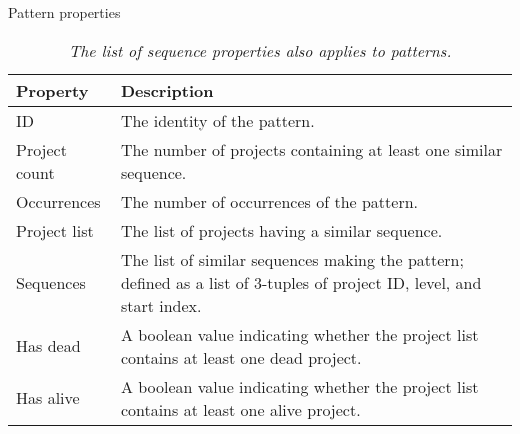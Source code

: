 \begin{table}[H]
\caption{Pattern properties}\label{table:pattern_props}
\caption*{\footnotesize\textit{The list of sequence properties also applies to
patterns.}}
\centering
\begin{tabular}{lp{10cm}}
\hline
	\textbf{Property} & \textbf{Description} \\
	\hline
	ID & The identity of the pattern. \\
	Project count & The number of projects containing at least one similar
	sequence. \\
	Occurrences & The number of occurrences of the pattern. \\
	Project list & The list of projects having a similar sequence. \\
	Sequences & The list of similar sequences making the pattern; defined as a list
	of 3-tuples of project ID, level, and start index. \\
	Has dead & A boolean value indicating whether the project list contains at
	least one dead project. \\
	Has alive & A boolean value indicating whether the project list contains at
	least one alive project. \\
\hline
\end{tabular}
\end{table}